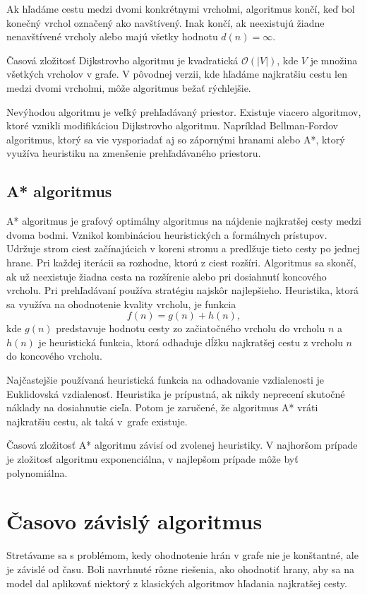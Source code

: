 Ak hľadáme cestu medzi dvomi konkrétnymi vrcholmi, algoritmus končí, keď bol konečný vrchol označený ako navštívený. Inak končí, ak neexistujú žiadne nenavštívené vrcholy alebo majú všetky hodnotu $d(n) = \infty$.

Časová zložitosť Dijkstrovho algoritmu je kvadratická
$\mathcal{O}(|V|)$, kde $V$ je množina všetkých vrcholov v grafe. V pôvodnej verzii, kde hľadáme najkratšiu cestu len medzi dvomi vrcholmi, môže algoritmus bežať rýchlejšie.

Nevýhodou algoritmu je veľký prehľadávaný priestor. Existuje viacero algoritmov, ktoré vznikli modifikáciou Dijkstrovho algoritmu. Napríklad Bellman-Fordov algoritmus, ktorý sa vie vysporiadať aj so zápornými hranami alebo A*, ktorý využíva heuristiku na zmenšenie prehľadávaného priestoru. 

\subsection{A* algoritmus}
\label{sec:a-star}
A* algoritmus je grafový optimálny algoritmus na nájdenie najkratšej cesty medzi dvoma bodmi. Vznikol kombináciou heuristických a formálnych prístupov. Udržuje strom ciest začínajúcich v koreni stromu a predlžuje tieto cesty po jednej hrane. Pri každej iterácii sa rozhodne, ktorú z ciest rozšíri. Algoritmus sa skončí, ak už neexistuje žiadna cesta na rozšírenie alebo pri dosiahnutí koncového vrcholu. Pri prehľadávaní používa stratégiu najskôr najlepšieho. Heuristika, ktorá sa využíva na ohodnotenie kvality vrcholu, je funkcia
\begin{equation}
f(n) = g(n) + h(n), 
\end{equation}
kde $g(n)$ predstavuje hodnotu cesty zo začiatočného vrcholu do vrcholu $n$ a $h(n)$ je heuristická funkcia, ktorá odhaduje dĺžku najkratšej cestu z vrcholu $n$ do koncového vrcholu.

Najčastejšie používaná heuristická funkcia na odhadovanie vzdialenosti je Euklidovská vzdialenosť.
Heuristika je prípustná, ak nikdy neprecení skutočné náklady na dosiahnutie cieľa. Potom je zaručené, že algoritmus A* vráti najkratšiu cestu, ak taká v~grafe existuje.

Časová zložitosť A* algoritmu závisí od zvolenej heuristiky. V najhoršom prípade je zložitosť algoritmu exponenciálna, v najlepšom prípade môže byť polynomiálna.

\section{Časovo závislý algoritmus}
\label{sec:time-dependant-algorithm}
Stretávame sa s problémom, kedy ohodnotenie hrán v grafe nie je konštantné, ale je závislé od času. Boli navrhnuté rôzne riešenia, ako ohodnotiť hrany, aby sa na model dal aplikovať niektorý z klasických algoritmov hľadania najkratšej cesty. 

